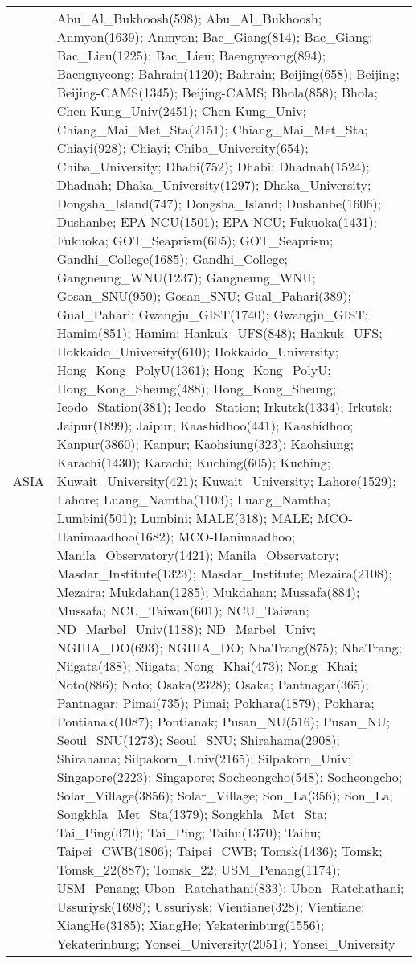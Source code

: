 \documentclass[journal abbreviation, manuscript]{copernicus}
\begin{document}
\begin{table}
\begin{tabularx}{\textwidth}{lX}
  ASIA      & Abu\_Al\_Bukhoosh(598); Abu\_Al\_Bukhoosh; Anmyon(1639); Anmyon; Bac\_Giang(814); Bac\_Giang; Bac\_Lieu(1225); Bac\_Lieu; Baengnyeong(894); Baengnyeong; Bahrain(1120); Bahrain; Beijing(658); Beijing; Beijing-CAMS(1345); Beijing-CAMS; Bhola(858); Bhola; Chen-Kung\_Univ(2451); Chen-Kung\_Univ; Chiang\_Mai\_Met\_Sta(2151); Chiang\_Mai\_Met\_Sta; Chiayi(928); Chiayi; Chiba\_University(654); Chiba\_University; Dhabi(752); Dhabi; Dhadnah(1524); Dhadnah; Dhaka\_University(1297); Dhaka\_University; Dongsha\_Island(747); Dongsha\_Island; Dushanbe(1606); Dushanbe; EPA-NCU(1501); EPA-NCU; Fukuoka(1431); Fukuoka; GOT\_Seaprism(605); GOT\_Seaprism; Gandhi\_College(1685); Gandhi\_College; Gangneung\_WNU(1237); Gangneung\_WNU; Gosan\_SNU(950); Gosan\_SNU; Gual\_Pahari(389); Gual\_Pahari; Gwangju\_GIST(1740); Gwangju\_GIST; Hamim(851); Hamim; Hankuk\_UFS(848); Hankuk\_UFS; Hokkaido\_University(610); Hokkaido\_University; Hong\_Kong\_PolyU(1361); Hong\_Kong\_PolyU; Hong\_Kong\_Sheung(488); Hong\_Kong\_Sheung; Ieodo\_Station(381); Ieodo\_Station; Irkutsk(1334); Irkutsk; Jaipur(1899); Jaipur; Kaashidhoo(441); Kaashidhoo; Kanpur(3860); Kanpur; Kaohsiung(323); Kaohsiung; Karachi(1430); Karachi; Kuching(605); Kuching; Kuwait\_University(421); Kuwait\_University; Lahore(1529); Lahore; Luang\_Namtha(1103); Luang\_Namtha; Lumbini(501); Lumbini; MALE(318); MALE; MCO-Hanimaadhoo(1682); MCO-Hanimaadhoo; Manila\_Observatory(1421); Manila\_Observatory; Masdar\_Institute(1323); Masdar\_Institute; Mezaira(2108); Mezaira; Mukdahan(1285); Mukdahan; Mussafa(884); Mussafa; NCU\_Taiwan(601); NCU\_Taiwan; ND\_Marbel\_Univ(1188); ND\_Marbel\_Univ; NGHIA\_DO(693); NGHIA\_DO; NhaTrang(875); NhaTrang; Niigata(488); Niigata; Nong\_Khai(473); Nong\_Khai; Noto(886); Noto; Osaka(2328); Osaka; Pantnagar(365); Pantnagar; Pimai(735); Pimai; Pokhara(1879); Pokhara; Pontianak(1087); Pontianak; Pusan\_NU(516); Pusan\_NU; Seoul\_SNU(1273); Seoul\_SNU; Shirahama(2908); Shirahama; Silpakorn\_Univ(2165); Silpakorn\_Univ; Singapore(2223); Singapore; Socheongcho(548); Socheongcho; Solar\_Village(3856); Solar\_Village; Son\_La(356); Son\_La; Songkhla\_Met\_Sta(1379); Songkhla\_Met\_Sta; Tai\_Ping(370); Tai\_Ping; Taihu(1370); Taihu; Taipei\_CWB(1806); Taipei\_CWB; Tomsk(1436); Tomsk; Tomsk\_22(887); Tomsk\_22; USM\_Penang(1174); USM\_Penang; Ubon\_Ratchathani(833); Ubon\_Ratchathani; Ussuriysk(1698); Ussuriysk; Vientiane(328); Vientiane; XiangHe(3185); XiangHe; Yekaterinburg(1556); Yekaterinburg; Yonsei\_University(2051); Yonsei\_University                                                                                                                                                                                                                                                                                                                                                                                                                                                                                                                                                                                                                                                                                                                                                                            
\end{tabularx}
\end{table}
\end{document}
